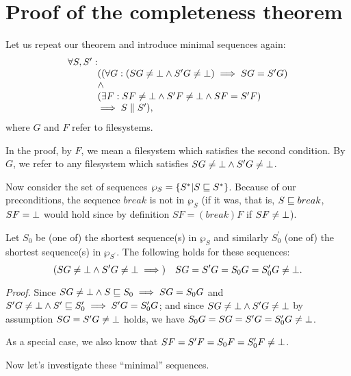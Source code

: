 \section{Proof of the completeness theorem}
\label{app:compl}

Let us repeat our theorem and introduce minimal sequences again:
\[\begin{array}{r@{}l}
\forall S,S':&\\
&((\forall G: (SG\ne\ud\wedge S'G\ne\ud)\implies SG=S'G)\\
&\wedge\\
&(\exists F: SF\ne\ud\wedge S'F\ne\ud\wedge SF=S'F)\\
&\implies S \eqifnbr S'),
\end{array}\]
where \(G\) and \(F\) refer to filesystems.
\newcommand{\varsection}[1]{\subsection{#1}}%

In the proof, by \(F\), we
mean a filesystem which satisfies the second condition. By \(G\), we
refer to any filesystem which satisfies \(SG\ne\bot\wedge S'G\ne\bot\).

Now consider the set of sequences \(\wp_S = \{ S^* | S \sqsubseteq S^*\}\).
Because of our preconditions, the sequence \(break\) is not in
\(\wp_S\) (if it was, that is, \(S\sqsubseteq break\), \(SF=\bot\) would hold
since by definition \(SF=(break)F\) if \(SF\ne\bot\)).

Let \(S_0\) be (one of) the shortest sequence(s) in \(\wp_S\) and
similarly
\(S^\prime_0\) (one of) the shortest sequence(s) in \(\wp_{S^\prime}\). 
%
The following holds for these sequences:
\[(SG\ne\bot\wedge S'G\ne\bot\implies) \quad SG=S'G=S_0G=S'_0G\ne\bot.\]
\begin{notrsi}
\emph{Proof.} Since 
\(SG\ne\bot\wedge S\sqsubseteq S_0\implies SG=S_0G\) and
\(S'G\ne\bot\wedge S'\sqsubseteq S'_0\implies S'G=S'_0G\); and since
\(SG\ne\bot\wedge S'G\ne\bot\) by assumption \(SG=S'G\ne\bot\) holds,
we have \(S_0G=SG=S'G=S'_0G\ne\bot\).

As a special case, we also know that \(SF=S'F=S_0F=S'_0F\ne\bot\).

\medskip
\end{notrsi}
Now let's investigate these ``minimal'' sequences. 

